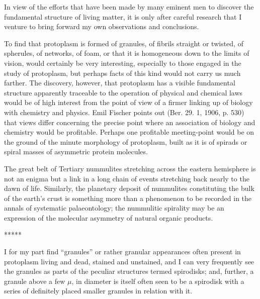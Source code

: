 \documentclass[a4paper, 12pt, oneside]{article}
\begin{document}
In view of the efforts that have been made by many eminent men to discover the fundamental structure of living matter, it is only after careful research that I venture to bring forward my own observations and conclusions.

To find that protoplasm is formed of granules, of fibrils straight or twisted, of spherules, of networks, of foam, or that it is homogeneous down to the limits of vision, would certainly be very interesting, especially to those engaged in the study of protoplasm, but perhaps facts of this kind would not carry us much farther. The discovery, however, that protoplasm has a visible fundamental structure apparently traceable to the operation of physical and chemical laws would be of high interest from the point of view of a firmer linking up of biology with chemistry and physics. Emil Fischer points out (Ber. 29. 1, 1906, p. 530) that views differ concerning the precise point where an association of biology and chemistry would be profitable. Perhaps one profitable meeting-point would be on the ground of the minute morphology of protoplasm, built as it is of spirads or spiral masses of asymmetric protein molecules.

The great belt of Tertiary nummulites stretching across the eastern hemisphere is not an enigma but a link in a long chain of events stretching back nearly to the dawn of life. Similarly, the planetary deposit of nummulites constituting the bulk of the earth's crust is something more than a phenomenon to be recorded in the annals of systematic palaeontology; the nummulitic spirality may be an expression of the molecular asymmetry of natural organic products.

\centerline{*\hspace{15mm}*\hspace{15mm}*\hspace{15mm}*\hspace{15mm}*}
\bigskip

I for my part find ``granules'' or rather granular appearances often present in protoplasm living and dead, stained and unstained, and I can very frequently see the granules as parts of the peculiar structures termed spirodisks; and, further, a granule above a few $\mu$, in diameter is itself often seen to be a spirodisk with a series of definitely placed smaller granules in relation with it.
\end{document}
